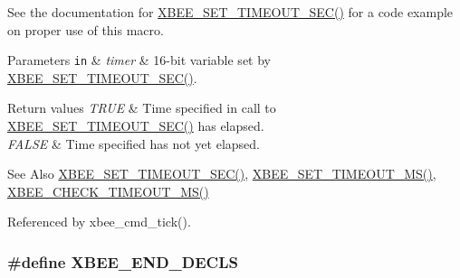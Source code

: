 See the documentation for \hyperlink{group__hal_ga6adb5c9e19c84a261c569ff4d77d1170}{X\-B\-E\-E\-\_\-\-S\-E\-T\-\_\-\-T\-I\-M\-E\-O\-U\-T\-\_\-\-S\-E\-C()} for a code example on proper use of this macro.


\begin{DoxyParams}[1]{Parameters}
\mbox{\tt in}  & {\em timer} & 16-\/bit variable set by \hyperlink{group__hal_ga6adb5c9e19c84a261c569ff4d77d1170}{X\-B\-E\-E\-\_\-\-S\-E\-T\-\_\-\-T\-I\-M\-E\-O\-U\-T\-\_\-\-S\-E\-C()}.\\
\hline
\end{DoxyParams}

\begin{DoxyRetVals}{Return values}
{\em T\-R\-U\-E} & Time specified in call to \hyperlink{group__hal_ga6adb5c9e19c84a261c569ff4d77d1170}{X\-B\-E\-E\-\_\-\-S\-E\-T\-\_\-\-T\-I\-M\-E\-O\-U\-T\-\_\-\-S\-E\-C()} has elapsed. \\
\hline
{\em F\-A\-L\-S\-E} & Time specified has not yet elapsed.\\
\hline
\end{DoxyRetVals}
\begin{DoxySeeAlso}{See Also}
\hyperlink{group__hal_ga6adb5c9e19c84a261c569ff4d77d1170}{X\-B\-E\-E\-\_\-\-S\-E\-T\-\_\-\-T\-I\-M\-E\-O\-U\-T\-\_\-\-S\-E\-C()}, \hyperlink{group__hal_ga848a9903fa7859d84cb22aeddde4c42f}{X\-B\-E\-E\-\_\-\-S\-E\-T\-\_\-\-T\-I\-M\-E\-O\-U\-T\-\_\-\-M\-S()}, \hyperlink{group__hal_gac3485c3c34a50a5a35d553cc743d163e}{X\-B\-E\-E\-\_\-\-C\-H\-E\-C\-K\-\_\-\-T\-I\-M\-E\-O\-U\-T\-\_\-\-M\-S()} 
\end{DoxySeeAlso}


Referenced by xbee\-\_\-cmd\-\_\-tick().

\hypertarget{group__hal_ga8d7f5a691878e9ffb7da396899581062}{
\subsubsection[{X\-B\-E\-E\-\_\-\-E\-N\-D\-\_\-\-D\-E\-C\-L\-S}]{\setlength{\rightskip}{0pt plus 5cm}\#define X\-B\-E\-E\-\_\-\-E\-N\-D\-\_\-\-D\-E\-C\-L\-S}}\label{group__hal_ga8d7f5a691878e9ffb7da396899581062}


